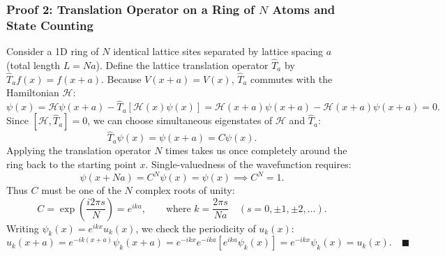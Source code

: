 \documentclass[11pt,a4paper]{article}
\begin{document}
\subsubsection{Proof 2: Translation Operator on a Ring of \texorpdfstring{$N$}{N} Atoms and State Counting}
Consider a 1D ring of $N$ identical lattice sites separated by lattice spacing $a$ (total length $L = Na$). Define the lattice translation operator $\hat{T}_a$ by $\hat{T}_a f(x) = f(x+a)$. Because $V(x+a) = V(x)$, $\hat{T}_a$ commutes with the Hamiltonian $\mathcal{H}$:
\begin{equation}
    [\mathcal{H}, \hat{T}_a]\psi(x) = \mathcal{H}\psi(x+a) - \hat{T}_a[\mathcal{H}(x)\psi(x)] = \mathcal{H}(x+a)\psi(x+a) - \mathcal{H}(x+a)\psi(x+a) = 0.
\end{equation}
Since $[\mathcal{H}, \hat{T}_a] = 0$, we can choose simultaneous eigenstates of $\mathcal{H}$ and $\hat{T}_a$:
\begin{equation}
    \hat{T}_a \psi(x) = \psi(x+a) = C\psi(x).
\end{equation}
Applying the translation operator $N$ times takes us once completely around the ring back to the starting point $x$. Single-valuedness of the wavefunction requires:
\begin{equation}
    \psi(x + Na) = C^N \psi(x) = \psi(x) \implies C^N = 1.
\end{equation}
Thus $C$ must be one of the $N$ complex roots of unity:
\begin{equation}
    C = \exp\left(\frac{i 2\pi s}{N}\right) = e^{ika}, \qquad \text{where } k = \frac{2\pi s}{Na} \quad (s = 0, \pm 1, \pm 2, \dots).
    \label{eq:allowed_k_ring}
\end{equation}
Writing $\psi_k(x) = e^{ikx}u_k(x)$, we check the periodicity of $u_k(x)$:
\begin{equation}
    u_k(x+a) = e^{-ik(x+a)}\psi_k(x+a) = e^{-ikx}e^{-ika}\left[e^{ika}\psi_k(x)\right] = e^{-ikx}\psi_k(x) = u_k(x). \quad \blacksquare
\end{equation}
\end{document}
